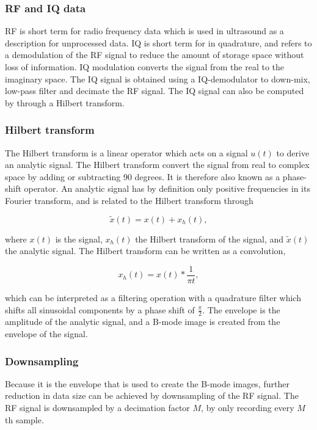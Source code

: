 \subsubsection{RF and IQ data}
RF is short term for radio frequency data which is used in ultrasound as a description for unprocessed data. IQ is short term for in quadrature, and refers to a demodulation of the RF signal to reduce the amount of storage space without loss of information. IQ modulation converts the signal from the real to the imaginary space. The IQ signal is obtained using a IQ-demodulator to down-mix, low-pass filter and decimate the RF signal. The IQ signal can also be computed by through a Hilbert transform\cite{Kirkhorn1999}.

\subsubsection{Hilbert transform}
The Hilbert transform is a linear operator which acts on a signal $u(t)$ to derive an analytic signal. The Hilbert transform convert the signal from real to complex space by adding or subtracting 90 degrees. It is therefore also known as a phase-shift operator. An analytic signal has by definition only positive frequencies in its Fourier transform, and is related to the Hilbert transform through 

\begin{equation}
\tilde{x}(t) = x(t) + x_h(t),
\end{equation}

where $x(t)$ is the signal, $x_h(t)$ the Hilbert transform of the signal, and $\tilde{x}(t)$ the analytic signal. The Hilbert transform can be written as a convolution, 

\begin{equation}
x_h(t) = x(t)*\frac{1}{\pi t},
\end{equation}

which can be interpreted as a filtering operation with a quadrature filter which shifts all sinusoidal components by a phase shift of $\frac{\pi}{2}$. The envelope is the amplitude of the analytic signal, and a B-mode image is created from the envelope of the signal. 

\subsubsection{Downsampling}
Because it is the envelope that is used to create the B-mode images, further reduction in data size can be achieved by downsampling of the RF signal. The RF signal is downsampled by a decimation factor $M$, by only recording every $M$th sample. 

